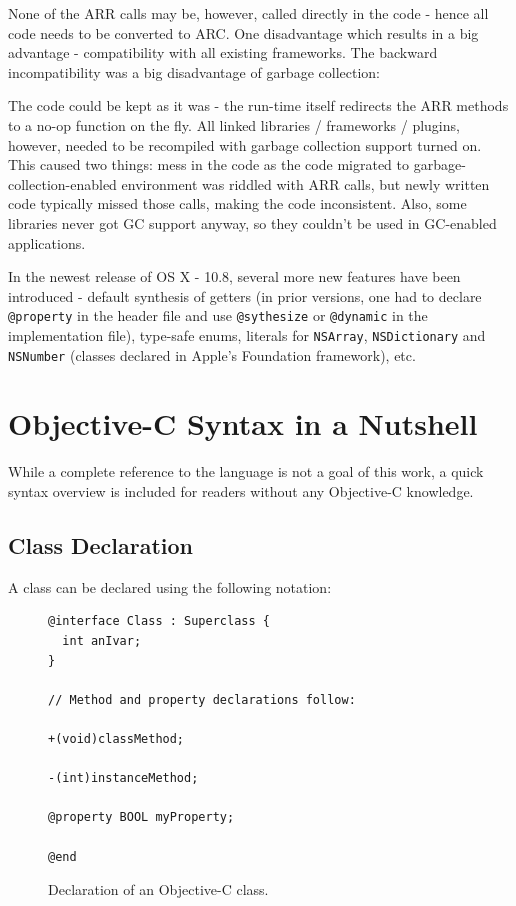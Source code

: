None of the ARR calls may be, however, called directly in the code - hence all code needs to be converted to ARC\@. One disadvantage which results in a big advantage - compatibility with all existing frameworks. The backward incompatibility was a big disadvantage of garbage collection: 

The code could be kept as it was - the run-time itself redirects the ARR methods to a no-op function on the fly. All linked libraries / frameworks / plugins, however, needed to be recompiled with garbage collection support turned on. This caused two things: mess in the code as the code migrated to garbage-collection-enabled environment was riddled with ARR calls, but newly written code typically missed those calls, making the code inconsistent. Also, some libraries never got GC support anyway, so they couldn't be used in GC-enabled applications.

In the newest release of OS X - 10.8, several more new features have been introduced - default synthesis of getters (in prior versions, one had to declare \verb=@property= in the header file and use \verb=@sythesize= or \verb=@dynamic= in the implementation file), type-safe enums, literals for \verb=NSArray=, \verb=NSDictionary= and \verb=NSNumber= (classes declared in Apple's Foundation framework), etc.

\section{Objective-C Syntax in a Nutshell}

While a complete reference to the language is not a goal of this work, a quick syntax overview is included for readers without any Objective-C knowledge.

\subsection{Class Declaration}

A class can be declared using the following notation:

\begin{figure}[H]
  \begin{verbatim}
@interface Class : Superclass {
  int anIvar;
}

// Method and property declarations follow:

+(void)classMethod;

-(int)instanceMethod;

@property BOOL myProperty;

@end
  \end{verbatim}
  \centering{}
  \caption{Declaration of an Objective-C class.}
  \label{fig:syntax_objc_class_decl}
\end{figure}

